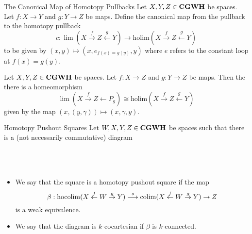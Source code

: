 \documentclass[a4paper]{article}
\begin{document}
\begin{defn}{The Canonical Map of Homotopy Pullbacks}{} Let $X,Y,Z\in\bold{CGWH}$ be spaces. Let $f:X\to Y$ and $g:Y\to Z$ be maps. Define the canonical map from the pullback to the homotopy pullback $$c:\lim(X\overset{f}{\rightarrow}Z\overset{g}{\leftarrow}Y)\to\text{holim}(X\overset{f}{\rightarrow}Z\overset{g}{\leftarrow}Y)$$ to be given by $(x,y)\mapsto(x,e_{f(x)=g(y)},y)$ where $e$ refers to the constant loop at $f(x)=g(y)$. 
\end{defn}

\begin{prp}{}{} Let $X,Y,Z\in\bold{CGWH}$ be spaces. Let $f:X\to Z$ and $g:Y\to Z$ be maps. Then the there is a homeomorphism $$\lim(X\overset{f}{\rightarrow}Z\leftarrow P_g)\cong\text{holim}(X\overset{f}{\rightarrow}Z\overset{g}{\leftarrow}Y)$$ given by the map $(x,(y,\gamma))\mapsto(x,\gamma,y)$. 
\end{prp}

\begin{defn}{Homotopy Pushout Squares}{} Let $W,X,Y,Z\in\bold{CGWH}$ be spaces such that there is a (not necessarily commutative) diagram \\~\\
\\~\\
\begin{itemize}
\item We say that the square is a homotopy pushout square if the map $$\beta:\operatorname*{hocolim}(X\overset{f}{\leftarrow}W\overset{g}{\rightarrow}Y)\overset{s}{\longrightarrow}\operatorname*{colim}(X\overset{f}{\leftarrow}W\overset{g}{\rightarrow}Y)\to Z$$ is a weak equivalence. 
\item We say that the diagram is $k$-cocartesian if $\beta$ is $k$-connected. 
\end{itemize}
\end{defn}
\end{document}
